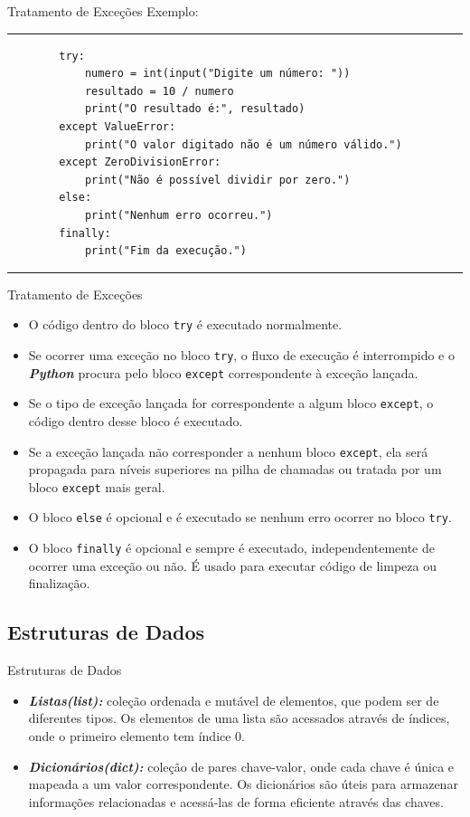\documentclass{beamer}
\begin{document}
\begin{frame}[fragile]{Tratamento de Exceções}
	Exemplo:
	\rule{\textwidth}{1pt}
	\scriptsize
	\begin{verbatim}
		try:
			numero = int(input("Digite um número: "))
			resultado = 10 / numero
			print("O resultado é:", resultado)
		except ValueError:
			print("O valor digitado não é um número válido.")
		except ZeroDivisionError:
			print("Não é possível dividir por zero.")
		else:
			print("Nenhum erro ocorreu.")
		finally:
			print("Fim da execução.")		
	\end{verbatim}
	\rule{\textwidth}{1pt}
\end{frame}

\begin{frame}[fragile]{Tratamento de Exceções}
\begin{itemize}
	\item O código dentro do bloco \texttt{try} é executado normalmente.
	\item Se ocorrer uma exceção no bloco \texttt{try}, o fluxo de execução é interrompido e o \textbf{\textit{Python}} procura pelo bloco \texttt{except} correspondente à exceção lançada.
	\item Se o tipo de exceção lançada for correspondente a algum bloco \texttt{except}, o código dentro desse bloco é executado.
	\item Se a exceção lançada não corresponder a nenhum bloco \texttt{except}, ela será propagada para níveis superiores na pilha de chamadas ou tratada por um bloco \texttt{except} mais geral.
	\item O bloco \texttt{else} é opcional e é executado se nenhum erro ocorrer no bloco \texttt{try}.
	\item O bloco \texttt{finally} é opcional e sempre é executado, independentemente de ocorrer uma exceção ou não. É usado para executar código de limpeza ou finalização.
\end{itemize}
\end{frame}


\subsection{Estruturas de Dados}

\begin{frame}[fragile]{Estruturas de Dados}
	\begin{itemize}
		\item \textbf{\textit{Listas(list):}} coleção ordenada e mutável de elementos, que podem ser de diferentes tipos. Os elementos de uma lista são acessados através de índices, onde o primeiro elemento tem índice 0.
		\item \textbf{\textit{Dicionários(dict):}} coleção de pares chave-valor, onde cada chave é única e mapeada a um valor correspondente. Os dicionários são úteis para armazenar informações relacionadas e acessá-las de forma eficiente através das chaves.
	\end{itemize}
\end{frame}
\end{document}
